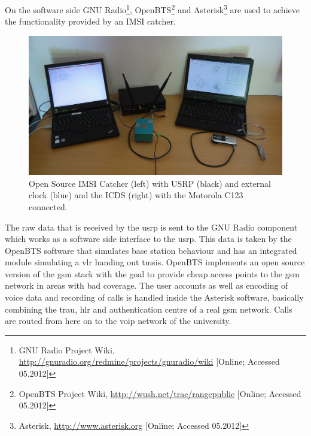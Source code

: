 On the software side GNU Radio\footnote{GNU Radio Project Wiki, \url{http://gnuradio.org/redmine/projects/gnuradio/wiki} [Online; Accessed 05.2012]}, OpenBTS\footnote{OpenBTS Project Wiki, \url{http://wush.net/trac/rangepublic} [Online; Accessed 05.2012]} and Asterisk\footnote{Asterisk, \url{http://www.asterisk.org} [Online; Accessed 05.2012]} are used to achieve the functionality provided by an IMSI catcher.
\begin{figure}
\centering
\includegraphics[width=.95\textwidth]{../Images/catcherICDS}
\caption{Open Source IMSI Catcher (left) with USRP (black) and external clock (blue) and the ICDS (right) with the Motorola C123 connected.}
\label{fig:setup}
\end{figure}
The raw data that is received by the \gls{usrp} is sent to the GNU Radio component which works as a software side interface to the \gls{usrp}.
This data is taken by the OpenBTS software that simulates base station behaviour and has an integrated module simulating a \gls{vlr} handing out \glspl{tmsi}.
OpenBTS implements an open source version of the \gls{gsm} stack with the goal to provide cheap access points to the \gls{gsm} network in areas with bad coverage.
The user accounts as well as encoding of voice data and recording of calls is handled inside the Asterisk software, basically combining the \gls{trau}, \gls{hlr} and authentication centre of a real \gls{gsm} network.
Calls are routed from here on to the \gls{voip} network of the university.


